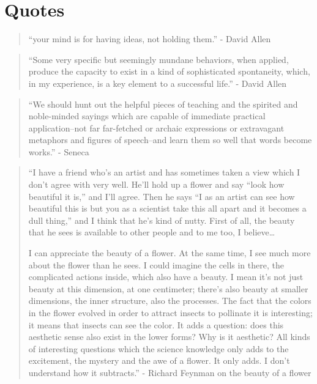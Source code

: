 \chapter{Quotes}

\begin{quotation}
“your mind is for having ideas, not holding them.” - David Allen
\end{quotation}

\begin{quotation}
``Some very specific but seemingly mundane behaviors, when applied, produce the capacity to exist in a kind of sophisticated spontaneity, which, in my experience, is a key element to a successful life.'' - David Allen
\end{quotation}

\begin{quotation}
“We should hunt out the helpful pieces of teaching and the spirited and noble-minded sayings which are capable of immediate practical application–not far far-fetched or archaic expressions or extravagant metaphors and figures of speech–and learn them so well that words become works.” - Seneca
\end{quotation}

\begin{quotation}
``I have a friend who’s an artist and has sometimes taken a view which I don’t agree with very well. He’ll hold up a flower and say “look how beautiful it is,” and I’ll agree. Then he says “I as an artist can see how beautiful this is but you as a scientist take this all apart and it becomes a dull thing,” and I think that he’s kind of nutty. First of all, the beauty that he sees is available to other people and to me too, I believe…

I can appreciate the beauty of a flower. At the same time, I see much more about the flower than he sees. I could imagine the cells in there, the complicated actions inside, which also have a beauty. I mean it’s not just beauty at this dimension, at one centimeter; there’s also beauty at smaller dimensions, the inner structure, also the processes. The fact that the colors in the flower evolved in order to attract insects to pollinate it is interesting; it means that insects can see the color. It adds a question: does this aesthetic sense also exist in the lower forms? Why is it aesthetic? All kinds of interesting questions which the science knowledge only adds to the excitement, the mystery and the awe of a flower. It only adds. I don’t understand how it subtracts.'' - Richard Feynman on the beauty of a flower
\end{quotation}

